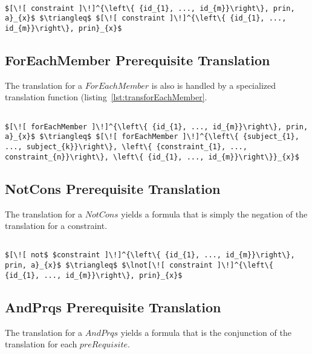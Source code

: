 \lstset{mathescape, language=AST}  
\begin{lstlisting}[frame=single, caption={Prerequisite Translation {$\colon$} Constraint},label={lst:transpreRequisiteConstraint}]

$[\![ constraint ]\!]^{\left\{ {id_{1}, ..., id_{m}}\right\}, prin, a}_{x}$ $\triangleq$ $[\![ constraint ]\!]^{\left\{ {id_{1}, ..., id_{m}}\right\}, prin}_{x}$ 
\end{lstlisting}

\subsection{ForEachMember Prerequisite Translation}
The translation for a $ForEachMember$ is also is handled by a specialized translation function (listing~\ref{lst:transforEachMember}.

\lstset{mathescape, language=AST}  
\begin{lstlisting}[frame=single, caption={Prerequisite Translation {$\colon$} ForEachMember},label={lst:transpreRequisiteForEachMember}]

$[\![ forEachMember ]\!]^{\left\{ {id_{1}, ..., id_{m}}\right\}, prin, a}_{x}$ $\triangleq$ $[\![ forEachMember ]\!]^{\left\{ {subject_{1}, ..., subject_{k}}\right\}, \left\{ {constraint_{1}, ..., constraint_{n}}\right\}, \left\{ {id_{1}, ..., id_{m}}\right\}}_{x}$ 	
\end{lstlisting}

\subsection{NotCons Prerequisite Translation}
The translation for a $NotCons$ yields a formula that is simply the negation of the translation for a constraint.

\lstset{mathescape, language=AST}  
\begin{lstlisting}[frame=single, caption={Prerequisite Translation {$\colon$} Not Constraint},label={lst:transpreRequisiteNotConstraint}]

$[\![ not$ $constraint ]\!]^{\left\{ {id_{1}, ..., id_{m}}\right\}, prin, a}_{x}$ $\triangleq$ $\lnot[\![ constraint ]\!]^{\left\{ {id_{1}, ..., id_{m}}\right\}, prin}_{x}$ 
\end{lstlisting}

\subsection{AndPrqs Prerequisite Translation}
The translation for a $AndPrqs$ yields a formula that is the conjunction of the translation for each $preRequisite$.

